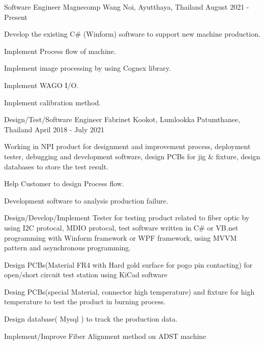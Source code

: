 
\begin{cventries}

  \cventry
    {Software Engineer} %
    {Magnecomp} %
    {Wang Noi, Ayutthaya, Thailand} %
    {August 2021 - Present} %
    {
      \begin{cvitems} %
      \item {Develop the existing C\# (Winform) software to support new machine production.}
        \item {Implement Process flow of machine.}
        \item {Implement image processing by using Cognex library.}
        \item {Implement WAGO I/O.}
        \item {Implement calibration method.}
      \end{cvitems}
    }

  \cventry
    {Design/Test/Software Engineer} %
    {Fabrinet} %
    {Kookot, Lumlookka Patumthanee, Thailand} %
    {April 2018 - July 2021} %
    {
      \begin{cvitems} %
        \item {Working in NPI product for designment and improvement
          process, deployment tester, debugging and development software, design
          PCBs for jig \& fixture, design databases to store the test result.}
        \item {Help Customer to design Process flow.}
        \item {Development software to analysis
          production failure.}
        \item {Design/Develop/Implement Tester for testing product related to
          fiber optic by using I2C protocal, MDIO protocal, test software
          written in C\# or VB.net programming with Winform framework or WPF
          framework, using MVVM pattern and asynchronous programming.}
        \item {Design PCBs(Material FR4 with Hard gold surface for pogo pin
          contacting) for open/short circuit test station using KiCad software}
        \item {Desing PCBs(special Material, connector high temperature) and
          fixture for high temperature to test the product in burning
          process.}
        \item {Design database( Mysql ) to track the production data.}
        \item {Implement/Improve Fiber Alignment method on ADST machine}
      \end{cvitems}
    }


\end{cventries}
